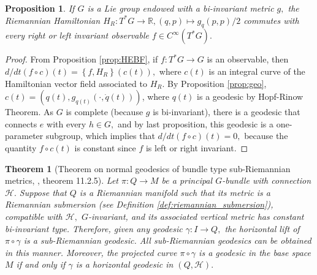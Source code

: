 \documentclass[12pt, letterpaper, reqno]{amsart}
\theoremstyle{definition}
\theoremstyle{plain}
\newtheorem{prop}{Proposition}
\newtheorem{thm}{Theorem}
\theoremstyle{remark}
\begin{document}
\begin{prop}\label{prop:essential_fact2}
	If $ G $ is a Lie group endowed with a bi-invariant metric $ g, $ the Riemannian Hamiltonian $ H_R : T^*G \rightarrow \mathbb{R}, (q,p) \mapsto g_q(p,p)/2$ commutes with every right or left invariant observable $ f\in C^\infty ( T^*G). $ 
\end{prop}
\begin{proof}
	From Proposition \ref{prop:HEBF}, if $ f: T^*G \rightarrow G $ is an observable, then $ d/dt \left( f\circ c \right) (t)= \left\{ f, H_R \right\}(c(t)),  $ where $ c(t) $ is an integral curve of the Hamiltonian vector field associated to $ H_R. $ By Proposition \ref{prop:geo}, $ c(t)=(q(t), g_{q(t)}(\cdot, \dot{q}(t))) $, where $ q(t) $ is a geodesic by Hopf-Rinow Theorem. As $ G $ is complete (because $ g $ is bi-invariant), there is a geodesic that connects $ e $ with every $ h\in G, $ and by last proposition, this geodesic is a one-parameter subgroup, which implies that $ d/dt(f\circ c)(t)=0, $ because the quantity $ f\circ c(t) $ is constant since $ f $ is left or right invariant.	
\end{proof}

\begin{thm}[Theorem on normal geodesics of bundle type sub-Riemannian metrics, \cite{montgomery2002tour}, theorem 11.2.5]\label{thm:normal_geodesics}
	Let $ \pi: Q \rightarrow M $ be a principal $ G $-bundle with connection $ \mathcal{H}. $ Suppose that $ Q $ is a Riemannian manifold such that its metric is a Riemannian submersion (see Definition \ref{def:riemannian_submersion}), compatible with $ \mathcal{H}, $ $ G $-invariant, and its associated vertical metric has constant bi-invariant type. Therefore, given any geodesic $\gamma: I \rightarrow Q, $ the horizontal lift of $ \pi\circ\gamma $ is a sub-Riemannian geodesic. All sub-Riemannian geodesics can be obtained in this manner. Moreover, the projected curve $ \pi\circ\gamma$ is a geodesic in the base space $ M $ if and only if $ \gamma $ is a horizontal geodesic in $ (Q, \mathcal{H}). $ 
\end{thm}
\end{document}
